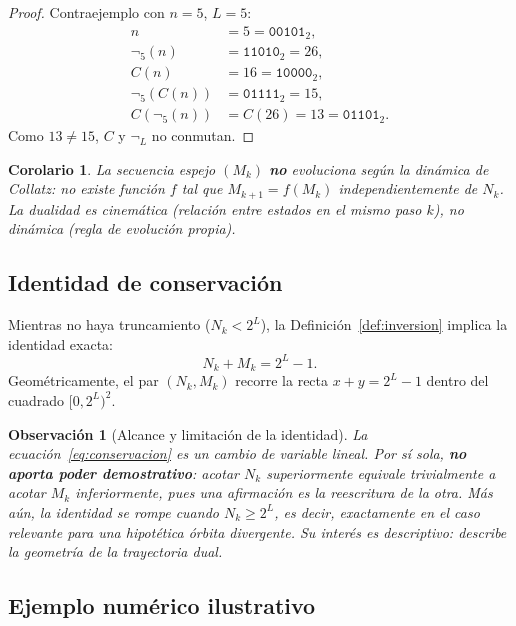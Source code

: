 \documentclass[11pt,a4paper]{article}
\newtheorem{corollary}[theorem]{Corolario}
\newtheorem{remark}[theorem]{Observación}
\begin{document}
\begin{proof}
Contraejemplo con $n = 5$, $L = 5$:
\begin{align*}
  n               &= 5 = \mathtt{00101}_2, \\
  \neg_5(n)       &= \mathtt{11010}_2 = 26, \\
  C(n)            &= 16 = \mathtt{10000}_2, \\
  \neg_5(C(n))    &= \mathtt{01111}_2 = 15, \\
  C(\neg_5(n))    &= C(26) = 13 = \mathtt{01101}_2.
\end{align*}
Como $13 \ne 15$, $C$ y $\neg_L$ no conmutan.
\end{proof}

\begin{corollary}
La secuencia espejo $(M_k)$ \textbf{no} evoluciona según la dinámica de
Collatz: no existe función $f$ tal que $M_{k+1} = f(M_k)$
independientemente de $N_k$.
La dualidad es \emph{cinemática} (relación entre estados en el mismo paso $k$),
no \emph{dinámica} (regla de evolución propia).
\end{corollary}

\subsection{Identidad de conservación}

Mientras no haya truncamiento ($N_k < 2^L$), la Definición~\ref{def:inversion}
implica la identidad exacta:
\begin{equation}
  N_k + M_k = 2^L - 1.
  \label{eq:conservacion}
\end{equation}
Geométricamente, el par $(N_k, M_k)$ recorre la recta $x+y = 2^L-1$
dentro del cuadrado $[0,2^L)^2$.

\begin{remark}[Alcance y limitación de la identidad]
La ecuación~\eqref{eq:conservacion} es un cambio de variable lineal.
Por sí sola, \textbf{no aporta poder demostrativo}:
acotar $N_k$ superiormente equivale trivialmente a acotar $M_k$
inferiormente, pues una afirmación es la reescritura de la otra.
Más aún, la identidad \emph{se rompe} cuando $N_k \ge 2^L$,
es decir, exactamente en el caso relevante para una hipotética
órbita divergente.
Su interés es \emph{descriptivo}: describe la geometría de la trayectoria dual.
\end{remark}

\subsection{Ejemplo numérico ilustrativo}
\end{document}
